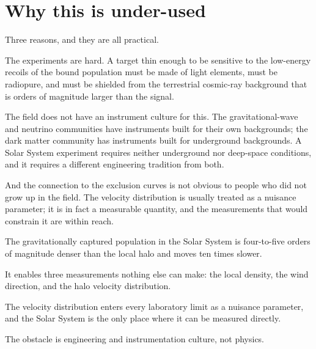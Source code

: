 \section{Why this is under-used}Three reasons, and they are all practical.

The experiments are hard. A target thin enough to be sensitive to the
low-energy recoils of the bound population must be made of light elements,
must be radiopure, and must be shielded from the terrestrial cosmic-ray
background that is orders of magnitude larger than the signal.

The field does not have an instrument culture for this. The
gravitational-wave and neutrino communities have instruments built for
their own backgrounds; the dark matter community has instruments built for
underground backgrounds. A Solar System experiment requires neither
underground nor deep-space conditions, and it requires a different
engineering tradition from both.

And the connection to the exclusion curves is not obvious to people who
did not grow up in the field. The velocity distribution is usually treated
as a nuisance parameter; it is in fact a measurable quantity, and the
measurements that would constrain it are within reach.

\begin{keytakeaways}
\item The gravitationally captured population in the Solar System is
four-to-five orders of magnitude denser than the local halo and moves ten
times slower.
\item It enables three measurements nothing else can make: the local density,
the wind direction, and the halo velocity distribution.
\item The velocity distribution enters every laboratory limit as a nuisance
parameter, and the Solar System is the only place where it can be measured
directly.
\item The obstacle is engineering and instrumentation culture, not physics.
\end{keytakeaways}
